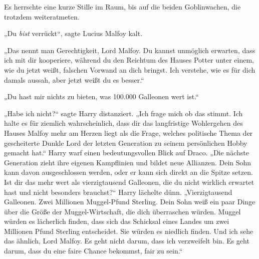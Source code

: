 Es herrschte eine kurze Stille im Raum, bis auf die beiden Goblinwachen, die trotzdem weiteratmeten.

„Du \emph{bist} verrückt“, sagte Lucius Malfoy kalt.

„Das nennt man Gerechtigkeit, Lord Malfoy. Du kannst unmöglich erwarten, dass ich mit dir kooperiere, während du den Reichtum des Hauses Potter unter einem, wie du jetzt weißt, falschen Vorwand an dich bringst. Ich verstehe, wie es für dich damals aussah, aber jetzt weißt du es besser.“

„Du hast mir nichts zu bieten, was 100.000 Galleonen wert ist.“

„Habe ich nicht?“ sagte Harry distanziert. „Ich frage mich ob das stimmt. Ich halte es für ziemlich wahrscheinlich, dass dir das langfristige Wohlergehen des Hauses Malfoy mehr am Herzen liegt als die Frage, welches politische Thema der gescheiterte Dunkle Lord der letzten Generation zu seinem persönlichen Hobby gemacht hat.“
Harry warf einen bedeutungsvollen Blick auf Draco.
„Die nächste Generation zieht ihre eigenen Kampflinien und bildet neue Allianzen. Dein Sohn kann davon ausgeschlossen werden, oder er kann sich direkt an die Spitze setzen. Ist dir das mehr wert als vierzigtausend Galleonen, die du nicht wirklich erwartet hast und nicht besonders brauchst?“ Harry lächelte dünn. „Vierzigtausend Galleonen. Zwei Millionen Muggel-Pfund Sterling. Dein Sohn weiß ein paar Dinge über die Größe der Muggel-Wirtschaft, die dich überraschen würden. Muggel würden es lächerlich finden, dass sich das Schicksal eines Landes um zwei Millionen Pfund Sterling entscheidet. Sie würden es niedlich finden. Und ich sehe das ähnlich, Lord Malfoy. Es geht nicht darum, dass ich verzweifelt bin. Es geht darum, dass du eine faire Chance bekommst, fair zu sein.“

